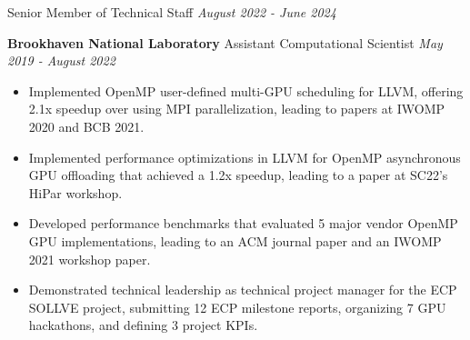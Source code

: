\noindent
{Senior Member of Technical Staff} \hfill \textit{August 2022 - June 2024}
\begin{itemize}[itemsep=-0.1em]
\myExpTwo 
\end{itemize}

\newcommand{\myExpThree}{
   \item Implemented OpenMP user-defined multi-GPU scheduling for LLVM, offering 2.1x speedup over using MPI parallelization, leading to papers at IWOMP 2020 and BCB 2021.
   \item Implemented performance optimizations in LLVM for OpenMP asynchronous GPU offloading that achieved a 1.2x speedup, leading to a paper at SC22's HiPar workshop. 
   \item Developed performance benchmarks that evaluated 5 major vendor OpenMP GPU implementations, leading to an ACM journal paper and an IWOMP 2021 workshop paper. 
   \item Demonstrated technical leadership as technical project manager for the ECP SOLLVE project, submitting 12 ECP milestone reports, organizing 7 GPU hackathons, and defining 3 project KPIs.
   }
\noindent
\textbf{Brookhaven National Laboratory}\hfill
{Assistant Computational Scientist} \hfill \textit{May 2019 - August 2022}
\begin{itemize}[itemsep=-0.1em]
\myExpThree
\end{itemize}


